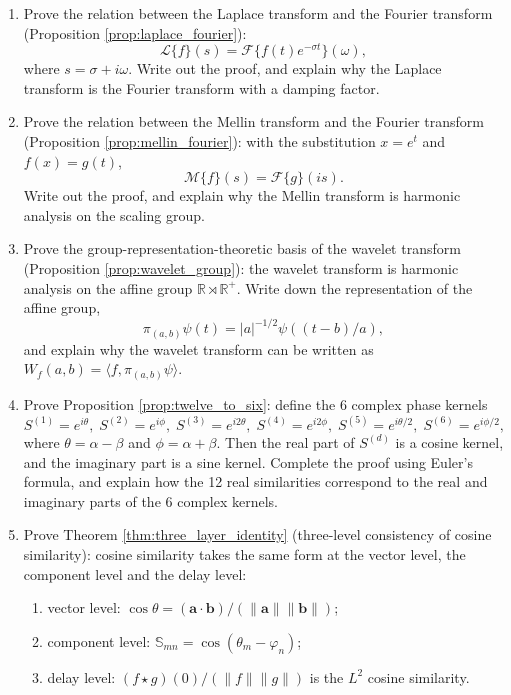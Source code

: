 \begin{enumerate}[leftmargin=3em, label=\textbf{Exercise \arabic*}]
    \item Prove the relation between the Laplace transform and the Fourier transform (Proposition \ref{prop:laplace_fourier}):
    \[
    \mathcal{L}\{f\}(s)=\mathcal{F}\{f(t)e^{-\sigma t}\}(\omega),
    \]
    where $s=\sigma+i\omega$.
    Write out the proof, and explain why the Laplace transform is the Fourier transform with a damping factor.

    \item Prove the relation between the Mellin transform and the Fourier transform (Proposition \ref{prop:mellin_fourier}):
    with the substitution $x=e^t$ and $f(x)=g(t)$,
    \[
    \mathcal{M}\{f\}(s)=\mathcal{F}\{g\}(is).
    \]
    Write out the proof, and explain why the Mellin transform is harmonic analysis on the scaling group.

    \item Prove the group-representation-theoretic basis of the wavelet transform (Proposition \ref{prop:wavelet_group}):
    the wavelet transform is harmonic analysis on the affine group $\mathbb{R}\rtimes\mathbb{R}^+$.
    Write down the representation of the affine group,
    \[
    \pi_{(a,b)}\psi(t)=|a|^{-1/2}\psi((t-b)/a),
    \]
    and explain why the wavelet transform can be written as
    $W_f(a,b)=\langle f,\pi_{(a,b)}\psi\rangle$.

    \item Prove Proposition \ref{prop:twelve_to_six}:
    define the 6 complex phase kernels
    \[
    S^{(1)}=e^{i\theta},\;S^{(2)}=e^{i\phi},\;S^{(3)}=e^{i2\theta},\;
    S^{(4)}=e^{i2\phi},\;S^{(5)}=e^{i\theta/2},\;S^{(6)}=e^{i\phi/2},
    \]
    where $\theta=\alpha-\beta$ and $\phi=\alpha+\beta$. Then the real part of $S^{(d)}$ is a cosine kernel,
    and the imaginary part is a sine kernel. Complete the proof using Euler's formula,
    and explain how the 12 real similarities correspond to the real and imaginary parts of the 6 complex kernels.

    \item Prove Theorem \ref{thm:three_layer_identity} (three-level consistency of cosine similarity):
    cosine similarity takes the same form at the vector level, the component level and the delay level:
    \begin{enumerate}[label=(\roman*)]
        \item vector level: $\cos\theta=(\mathbf{a}\cdot\mathbf{b})/(\|\mathbf{a}\|\|\mathbf{b}\|)$;
        \item component level: $\mathbb{S}_{mn}=\cos(\theta_m-\varphi_n)$;
        \item delay level: $(f\star g)(0)/(\|f\|\|g\|)$ is the $L^2$ cosine similarity.
    \end{enumerate}


\end{enumerate}
